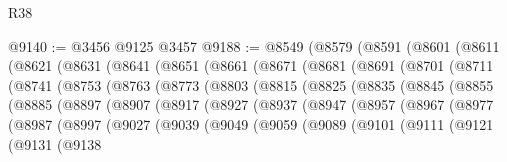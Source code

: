 \begin{lexlean}{R38}
\begin{coremodule}
@9140 := @3456 @9125 @3457
@9188 := @8549
    (@8579
      (@8591
        (@8601
          (@8611
            (@8621
              (@8631
                (@8641
                  (@8651
                    (@8661
                      (@8671
                        (@8681
                          (@8691
                            (@8701
                              (@8711
                                (@8741
                                  (@8753
                                    (@8763
                                      (@8773
                                        (@8803
                                          (@8815
                                            (@8825
                                              (@8835
                                                (@8845
                                                  (@8855
                                                    (@8885
                                                      (@8897
                                                        (@8907
                                                          (@8917
                                                            (@8927
                                                              (@8937
                                                                (@8947
                                                                  (@8957
                                                                    (@8967
                                                                      (@8977
                                                                        (@8987
                                                                          (@8997
                                                                            (@9027
                                                                              (@9039
                                                                                (@9049
                                                                                  (@9059
                                                                                    (@9089
                                                                                      (@9101
                                                                                        (@9111
                                                                                          (@9121
                                                                                            (@9131
                                                                                              (@9138

\end{coremodule}
\end{lexlean}
